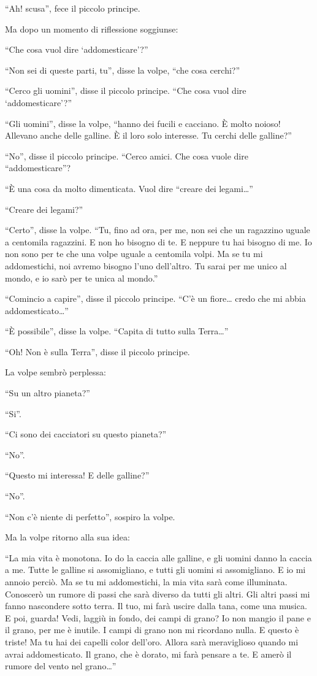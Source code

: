 \documentclass[11pt]{scrbook}
\begin{document}
``Ah! scusa'', fece il piccolo principe.

Ma dopo un momento di riflessione soggiunse:

``Che cosa vuol dire `addomesticare'?''

``Non sei di queste parti, tu'', disse la volpe, ``che cosa cerchi?''

``Cerco gli uomini'', disse il piccolo principe. ``Che cosa vuol dire `addomesticare'?''

``Gli uomini'', disse la volpe, ``hanno dei fucili e cacciano. È molto noioso! Allevano anche delle galline. È il loro solo interesse. Tu cerchi delle galline?''

``No'', disse il piccolo principe. ``Cerco amici. Che cosa vuole dire ``addomesticare''?

``È una cosa da molto dimenticata. Vuol dire ``creare dei legami\ldots{}''

``Creare dei legami?''

``Certo'', disse la volpe. ``Tu, fino ad ora, per me, non sei che un ragazzino uguale a centomila ragazzini. E non ho bisogno di te. E neppure tu hai bisogno di me. Io non sono per te che una volpe uguale a centomila volpi. Ma se tu mi addomestichi, noi avremo bisogno l'uno dell'altro. Tu sarai per me unico al mondo, e io sarò per te unica al mondo.''

``Comincio a capire'', disse il piccolo principe. ``C'è un fiore\ldots{} credo che mi abbia addomesticato\ldots{}''

``È possibile'', disse la volpe. ``Capita di tutto sulla Terra\ldots{}''

``Oh! Non è sulla Terra'', disse il piccolo principe.

La volpe sembrò perplessa:

``Su un altro pianeta?''

``Si''.

``Ci sono dei cacciatori su questo pianeta?''

``No''.

``Questo mi interessa! E delle galline?''

``No''.

``Non c'è niente di perfetto'', sospiro la volpe.

Ma la volpe ritorno alla sua idea:

``La mia vita è monotona. Io do la caccia alle galline, e gli uomini danno la caccia a me. Tutte le galline si assomigliano, e tutti gli uomini si assomigliano. E io mi annoio perciò. Ma se tu mi addomestichi, la mia vita sarà come illuminata. Conoscerò un rumore di passi che sarà diverso da tutti gli altri. Gli altri passi mi fanno nascondere sotto terra. Il tuo, mi farà uscire dalla tana, come una musica. E poi, guarda! Vedi, laggiù in fondo, dei campi di grano? Io non mangio il pane e il grano, per me è inutile. I campi di grano non mi ricordano nulla. E questo è triste! Ma tu hai dei capelli color dell'oro. Allora sarà meraviglioso quando mi avrai addomesticato. Il grano, che è dorato, mi farà pensare a te. E amerò il rumore del vento nel grano\ldots{}''
\end{document}
